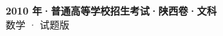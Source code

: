 \documentclass[zihao=-4, a4paper]{ctexart}
\begin{document}
\begin{center}
  {\Large\bfseries 2010 年·普通高等学校招生考试·陕西卷·文科}\\[4pt]
  {\large 数学 · 试题版}
\end{center}
\medskip
{}

\end{document}
